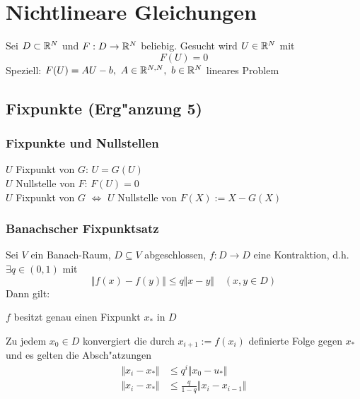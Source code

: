\documentclass{scrartcl}
\begin{document}
\section{Nichtlineare Gleichungen}
Sei $D \subset \mathbb{R}^N$ und $F: D \rightarrow \mathbb{R}^N$ beliebig. Gesucht wird $U \in \mathbb{R}^N$ mit 
$$F(U) = 0$$
Speziell: $F(U) = AU - b, \ A \in \RR^{N,N}, \ b \in \RR^N$ lineares Problem
\subsection{Fixpunkte (Erg"anzung 5)}
\subsubsection{Fixpunkte und Nullstellen}
$U$ Fixpunkt von $G$: $U = G(U)$ \\
$U$ Nullstelle von $F$: $F(U) = 0$ \\
$U$ Fixpunkt von $G$ $\Leftrightarrow$ $U$ Nullstelle von $F(X) := X - G(X)$
\subsubsection{Banachscher Fixpunktsatz}
Sei $V$ ein Banach-Raum, $D \subseteq V$ abgeschlossen, $f: D \longrightarrow D$ eine Kontraktion, d.h. $\exists q \in (0,1)$ mit
$$\Vert f(x) - f(y) \Vert \leq q \Vert x - y \Vert \quad (x,y \in D)$$
Dann gilt:
\begin{iaufz}
\item $f$ besitzt genau einen Fixpunkt $x_*$ in $D$
\item Zu jedem $x_0 \in D$ konvergiert die durch $x_{i+1} := f(x_i)$ definierte Folge gegen $x_*$ und es gelten die Absch"atzungen
\begin{align}
\Vert x_i - x_* \Vert &\leq q^i \Vert x_0 - u_* \Vert \tag{A priori Absch"atzung} \\
\Vert x_i - x_* \Vert &\leq \frac{q}{1-q} \Vert x_i - x_{i-1} \Vert \tag{A posteriori Absch"atzung}
\end{align}
\end{iaufz}
\end{document}
